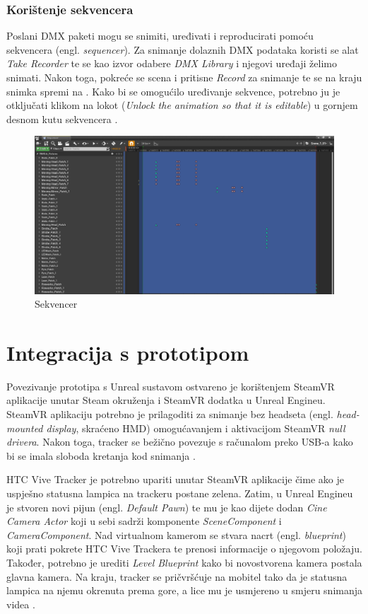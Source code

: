 \documentclass[times, utf8, zavrsni, numeric]{fer}
\begin{document}
\subsection{Korištenje sekvencera}
Poslani DMX paketi mogu se snimiti, uređivati i reproducirati pomoću sekvencera (engl. \emph{sequencer}). Za snimanje dolaznih DMX podataka koristi se alat \emph{Take Recorder} te se kao izvor odabere \emph{DMX Library} i njegovi uređaji želimo snimati. Nakon toga, pokreće se scena i pritisne \emph{Record} za snimanje te se na kraju snimka spremi na . Kako bi se omogućilo uređivanje sekvence, potrebno ju je otključati klikom na lokot (\emph{Unlock the animation so that it is editable}) u gornjem desnom kutu sekvencera \cite{dmx_tracks}.\\

\begin{figure}[htp]
	\centering
	\includegraphics[width=\linewidth]{slika 6-12.png}
	\caption{Sekvencer}
	\label{fig:slika 6-12}
\end{figure}

\chapter{Integracija s prototipom}
Povezivanje prototipa s Unreal sustavom ostvareno je korištenjem SteamVR aplikacije unutar Steam okruženja i SteamVR dodatka u Unreal Engineu. SteamVR aplikaciju potrebno je prilagoditi za snimanje bez headseta (engl. \emph{head-mounted display}, skraćeno HMD) omogućavanjem i aktivacijom SteamVR \emph{null drivera}. Nakon toga, tracker se bežično povezuje s računalom preko USB-a kako bi se imala sloboda kretanja kod snimanja \cite{vp}. \newline

HTC Vive Tracker je potrebno upariti unutar SteamVR aplikacije čime ako je uspješno statusna lampica na trackeru postane zelena. Zatim, u Unreal Engineu je stvoren novi pijun (engl. \emph{Default Pawn}) te mu je kao dijete dodan \emph{Cine Camera Actor} koji u sebi sadrži komponente \emph{SceneComponent} i \emph{CameraComponent}. Nad virtualnom kamerom se stvara nacrt (engl. \emph{blueprint}) koji prati pokrete HTC Vive Trackera te prenosi informacije o njegovom položaju. Također, potrebno je urediti \emph{Level Blueprint} kako bi novostvorena kamera postala glavna kamera. Na kraju, tracker se pričvršćuje na mobitel tako da je statusna lampica na njemu okrenuta prema gore, a lice mu je usmjereno u smjeru snimanja videa \cite{vp}. \newline
\end{document}
